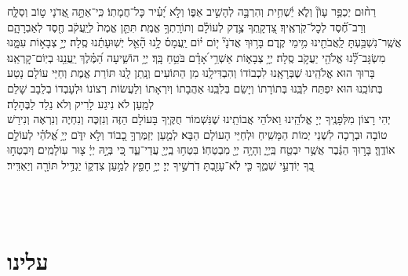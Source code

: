 \documentclass[twoside, openany, parskip=half, 11pt]{book}
\begin{document}
\begin{sometimes}
%
רַח֨וּם יְכַפֵּ֥ר עָוֹן֘ וְלֹ֢א יַ֫שְׁחִ֥ית וְהִרְבָּ֣ה לְהָשִׁ֣יב אַפּ֑וֹ וְלֹ֣א יָ֝עִ֗יר כׇּל־חֲמָתֽוֹ׃ כִּֽי־אַתָּ֣ה
%
אֲ֭דֹנָי ט֣וֹב וְסַלָּ֑ח וְרַב־חֶ֝֗סֶד לְכׇל־קֹֽרְאֶֽיךָ׃ צִ֭דְקָֽתְךָ
%
צֶ֥דֶק לְעוֹלָ֗ם וְתוֹרָֽתְךָ֥ אֱמֶֽת׃ תִּתֵּ֤ן
%
אֱמֶת֙ לְיַֽעֲקֹ֔ב חֶ֖סֶד לְאַבְרָהָ֑ם אֲשֶֽׁר־נִשְׁבַּ֥עְתָּ לַֽאֲבֹתֵ֖ינוּ מִ֥ימֵי קֶֽדֶם׃ בָּר֥וּךְ
%
אֲדֹנָי֘ י֤וֹם י֗וֹם יַֽעֲמָס֫ לָ֥נוּ הָ֘אֵ֤ל יְשֽׁוּעָתֵ֬נוּ סֶֽלָה׃ יְיָ֣
%
צְבָא֣וֹת עִמָּ֑נוּ מִשְׂגָּב־לָ֝֗נוּ אֱלֹהֵ֖י יַעֲקֹ֣ב סֶֽלָה׃ יְיָ֥
%
צְבָא֑וֹת אַשְׁרֵ֥י ֝אָדָ֗ם בֹּטֵ֥חַ בָּֽךְ׃ יְיָ֥
%
הוֹשִׁ֑יעָה הַ֝מֶּ֗לֶךְ יַֽעֲנֵ֥נוּ בְיֽוֹם־קׇרְאֵֽנוּ׃ \\
בָּרוּךְ הוּא אֱלֹהֵֽינוּ שֶׁבְּרָאָֽנוּ לִכְבוֹדוֹ וְהִבְדִּילָֽנוּ מִן הַתּוֹעִים וְנָֽתַן לָֽנוּ תּוֹרַת אֱמֶת וְחַיֵּי עוֹלָם נָטַע בְּתוֹכֵֽנוּ הוּא יִפְתַּח לִבֵּֽנוּ בְּתוֹרָתוֹ וְיָשֵׂם בְּלִבֵּֽנוּ אַהֲבָתוֹ וְיִרְאָתוֹ וְלַעֲשׂוֹת רְצוֹנוֹ וּלְעָבְדוֹ בְלֵבָב שָׁלֵם לְמַֽעַן לֹא נִיגַע לָרִיק וְלֹא נֵלֵד לַבֶּהָלָה׃\\
יְהִי רָצוֹן מִלְּפָנֶֽיךָ יְיָ אֱלֹהֵֽינוּ וֵאלֹהֵי אֲבוֹתֵֽינוּ שֶׁנִּשְׁמוֹר חֻקֶּֽיךָ בָּעוֹלָם הַזֶּה וְנִזְכֶּה וְנִחְיֶה וְנִרְאֶה וְנִירַשׁ טוֹבָה וּבְרָכָה לִשְׁנֵי יְמוֹת הַמָּשִֽׁיחַ וּלְחַיֵּי הָעוֹלָם הַבָּא׃ לְמַ֤עַן יְזַמֶּרְךָ֣ כָ֭בוֹד וְלֹ֣א יִדֹּ֑ם יְיָ֥ אֱ֝לֹהַ֗י לְעוֹלָ֣ם אוֹדֶֽךָּ׃ בָּר֣וּךְ הַגֶּ֔בֶר אֲשֶׁ֥ר יִבְטַ֖ח בַּֽיְיָ֑ וְהָיָ֥ה יְיָ֖ מִבְטַחֽוֹ׃ בִּטְח֥וּ
%
בַֽיְיָ֖ עֲדֵי־עַ֑ד כִּ֚י בְּיָ֣הּ יְיָ֔ צ֖וּר עֽוֹלָמִֽים׃ וְיִבְטְח֣וּ
%
בְ֭ךָ יֽוֹדְעֵ֣י שְׁמֶ֑ךָ כִּ֤י לֹֽא־עָזַ֖בְתָּ דֹֽרְשֶׁ֣יךָ יְיָ׃ יְיָ֥
%
חָפֵ֖ץ לְמַ֣עַן צִדְק֑וֹ יַגְדִּ֥יל תּוֹרָ֖ה וְיַאְדִּֽיר׃

\end{sometimes}

\fullkaddish

\vfill

\\
\\

\clearpage
\section*{ עלינו }

\aleinu

\ledavid

\mournerskaddish

\vfill
\end{document}
